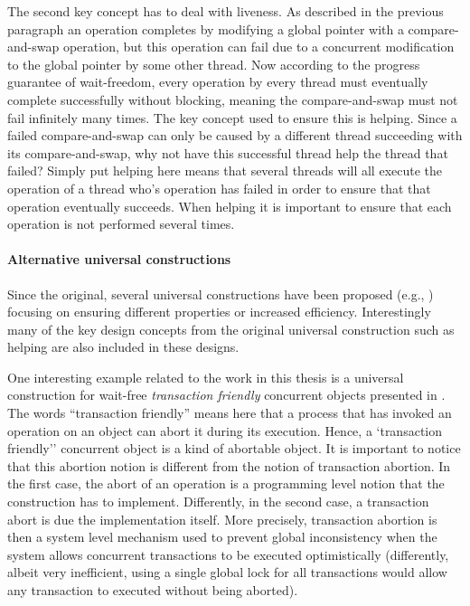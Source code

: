 The second key concept has to deal with liveness.
As described in the previous paragraph an operation completes by
modifying a global pointer with a compare-and-swap operation,
but this operation can fail due to a concurrent modification
to the global pointer by some other thread.
Now according to the progress guarantee of wait-freedom, every operation
by every thread must eventually complete successfully without blocking,
meaning the compare-and-swap must not fail infinitely many times.
The key concept used to ensure this is helping.
Since a failed compare-and-swap can only be caused by a different thread
succeeding with its compare-and-swap, why not have this successful
thread help the thread that failed?
Simply put helping here means that several threads will all execute
the operation of a thread who's operation has failed in order to ensure
that that operation eventually succeeds.
When helping it is important to ensure
that each operation is not performed several times.

\paragraph{Alternative universal constructions}
Since the original, several  universal constructions have been proposed
(e.g., \cite{ADT95,AM99,FK09}) focusing on ensuring different properties
or increased efficiency.
Interestingly many of the key design concepts from the original universal construction
such as helping are also included in these designs.

One interesting example related to the work in this thesis is
a universal construction for wait-free {\it transaction friendly} 
concurrent objects presented in \cite{CER10}. The words 
``transaction friendly'' means here that a process that has invoked an
operation on an object can abort it during its execution. Hence, 
a `transaction friendly'' concurrent object is a kind of  
abortable object.  It is important to notice  that  this  abortion 
notion is different from  the notion of  transaction abortion. 
In the first case, the abort of an operation is a programming level notion
that  the construction has to implement. 
Differently, in the second case,  a transaction abort is  due 
the implementation itself. More precisely, 
transaction abortion is then a system level mechanism used to  prevent  
global inconsistency when  the system allows concurrent transactions 
to be  executed
optimistically (differently, albeit very inefficient,  using a single 
global lock for  all transactions would allow any  transaction to executed
without being aborted).


